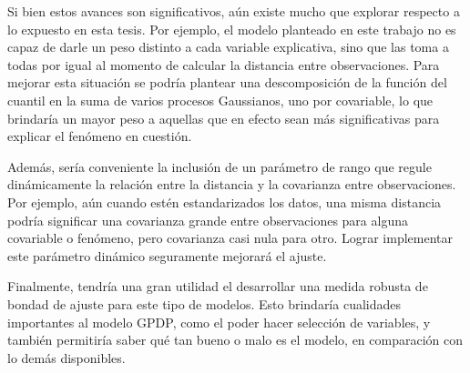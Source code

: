 Si bien estos avances son significativos, a\'un existe mucho que explorar respecto a lo expuesto en esta tesis. Por ejemplo, el modelo planteado en este trabajo no es capaz de darle un peso distinto a cada variable explicativa, sino que las toma  a todas por igual al momento de calcular la distancia entre observaciones. Para mejorar esta situaci\'on se podr\'ia plantear una descomposici\'on de la funci\'on del cuantil en la suma de varios procesos Gaussianos, uno por covariable, lo que brindar\'ia un mayor peso a aquellas que en efecto sean m\'as significativas para explicar el fen\'omeno en cuesti\'on. 

Adem\'as, ser\'ia conveniente la inclusi\'on de un par\'ametro de rango que regule din\'amicamente la relaci\'on entre la distancia y la covarianza entre observaciones. Por ejemplo, a\'un cuando est\'en estandarizados los datos, una misma distancia podr\'ia significar una covarianza grande entre observaciones para alguna covariable o fen\'omeno, pero covarianza casi nula para otro. Lograr implementar este par\'ametro din\'amico seguramente mejorar\'a el ajuste.

Finalmente, tendr\'ia una gran utilidad el desarrollar una medida robusta de bondad de ajuste para este tipo de modelos. Esto brindar\'ia cualidades importantes al modelo GPDP, como el poder hacer selecci\'on de variables, y tambi\'en permitir\'ia saber qu\'e tan bueno o malo es el modelo, en comparaci\'on con lo dem\'as disponibles. 

\newpage 